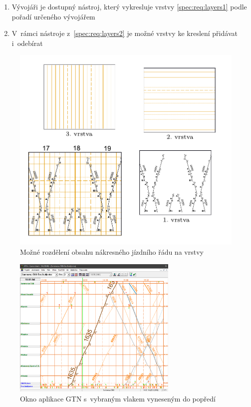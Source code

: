 \begin{enumerate}[label=\color{reqcolor}\textbf{R{\arabic*}},resume]
	\item \label{spec:req:layers2} Vývojáři je dostupný nástroj, který vykresluje vrstvy \ref{spec:req:layers1} podle pořadí určeného vývojářem
	\item \label{spec:req:layers3} V~rámci nástroje z~\ref{spec:req:layers2} je možné vrstvy ke kreslení přidávat i~odebírat
\end{enumerate}

\begin{figure}[!htb]
	\centering					
	\includegraphics[width=\textwidth]{../img/kap2_drawing_layers}
	\caption{Možné rozdělení obsahu nákresného jízdního řádu na vrstvy}
	\label{fig:spec:njr_vrstvy}
\end{figure}

\begin{figure}[!htb]
	\centering					
	\includegraphics[width=0.7\textwidth]{../img/kap1_gtn_okno_interval_3h}
	\caption{Okno aplikace GTN s~vybraným vlakem vyneseným do popředí}
	\label{fig:spec:gtn_vrstva_vybrany_vlak}
\end{figure}

